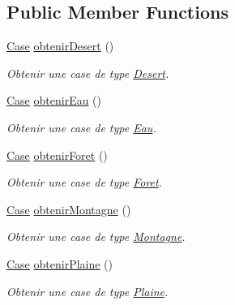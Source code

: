 \subsection*{Public Member Functions}
\begin{DoxyCompactItemize}
\item 
\hyperlink{class_small_world_1_1_case}{Case} \hyperlink{interface_small_world_1_1_inter_fabrique_case_ac376254f1e6e55abb83f079fc8793034}{obtenir\-Desert} ()
\begin{DoxyCompactList}\small\item\em Obtenir une case de type \hyperlink{class_small_world_1_1_desert}{Desert}. \end{DoxyCompactList}\item 
\hyperlink{class_small_world_1_1_case}{Case} \hyperlink{interface_small_world_1_1_inter_fabrique_case_a9dfab92cb279671297513e32d11994c1}{obtenir\-Eau} ()
\begin{DoxyCompactList}\small\item\em Obtenir une case de type \hyperlink{class_small_world_1_1_eau}{Eau}. \end{DoxyCompactList}\item 
\hyperlink{class_small_world_1_1_case}{Case} \hyperlink{interface_small_world_1_1_inter_fabrique_case_ac30d13640a58338ff314f3a289da5b8b}{obtenir\-Foret} ()
\begin{DoxyCompactList}\small\item\em Obtenir une case de type \hyperlink{class_small_world_1_1_foret}{Foret}. \end{DoxyCompactList}\item 
\hyperlink{class_small_world_1_1_case}{Case} \hyperlink{interface_small_world_1_1_inter_fabrique_case_a9d324c968a0926fe31f29199948dd9df}{obtenir\-Montagne} ()
\begin{DoxyCompactList}\small\item\em Obtenir une case de type \hyperlink{class_small_world_1_1_montagne}{Montagne}. \end{DoxyCompactList}\item 
\hyperlink{class_small_world_1_1_case}{Case} \hyperlink{interface_small_world_1_1_inter_fabrique_case_afccc307065f7d06dc99fc268604798c7}{obtenir\-Plaine} ()
\begin{DoxyCompactList}\small\item\em Obtenir une case de type \hyperlink{class_small_world_1_1_plaine}{Plaine}. \end{DoxyCompactList}\end{DoxyCompactItemize}



